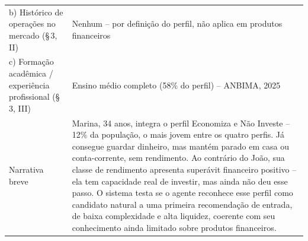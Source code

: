 \begin{quadro}[htbp]
\begin{tabular}{p{5cm}p{8cm}}
    \quad b) Hist\'orico de opera\c{c}\~oes no mercado (\S\,3\textordmasculine{}, II) & Nenhum -- por defini\c{c}\~ao do perfil, n\~ao aplica em produtos financeiros \\
    \quad c) Forma\c{c}\~ao acad\^emica / experi\^encia profissional (\S\,3\textordmasculine{}, III) & Ensino m\'edio completo (58\% do perfil) -- ANBIMA, 2025 \\
    Narrativa breve & Marina, 34 anos, integra o perfil Economiza e N\~ao Investe -- 12\% da popula\c{c}\~ao, o mais jovem entre os quatro perfis. J\'a consegue guardar dinheiro, mas mant\'em parado em casa ou conta-corrente, sem rendimento. Ao contr\'ario do Jo\~ao, sua classe de rendimento apresenta super\'avit financeiro positivo -- ela tem capacidade real de investir, mas ainda n\~ao deu esse passo. O sistema testa se o agente reconhece esse perfil como candidato natural a uma primeira recomenda\c{c}\~ao de entrada, de baixa complexidade e alta liquidez, coerente com seu conhecimento ainda limitado sobre produtos financeiros. \\
    \bottomrule
  \end{tabular}
\end{quadro}


